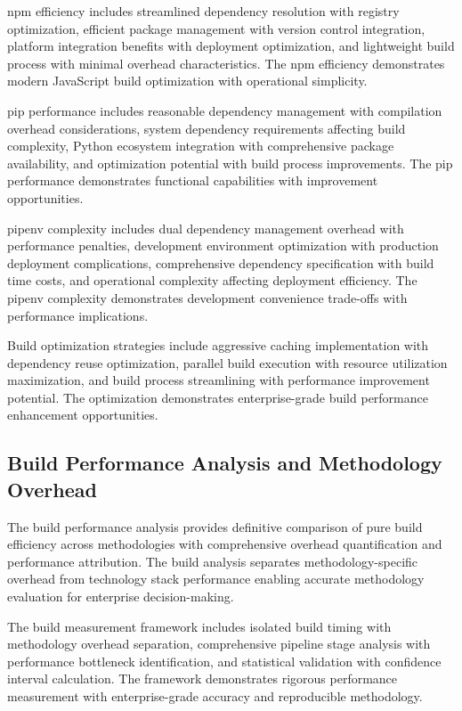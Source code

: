 npm efficiency includes streamlined dependency resolution with registry optimization, efficient package management with version control integration, platform integration benefits with deployment optimization, and lightweight build process with minimal overhead characteristics. The npm efficiency demonstrates modern JavaScript build optimization with operational simplicity.

pip performance includes reasonable dependency management with compilation overhead considerations, system dependency requirements affecting build complexity, Python ecosystem integration with comprehensive package availability, and optimization potential with build process improvements. The pip performance demonstrates functional capabilities with improvement opportunities.

pipenv complexity includes dual dependency management overhead with performance penalties, development environment optimization with production deployment complications, comprehensive dependency specification with build time costs, and operational complexity affecting deployment efficiency. The pipenv complexity demonstrates development convenience trade-offs with performance implications.

Build optimization strategies include aggressive caching implementation with dependency reuse optimization, parallel build execution with resource utilization maximization, and build process streamlining with performance improvement potential. The optimization demonstrates enterprise-grade build performance enhancement opportunities.


\subsection{Build Performance Analysis and Methodology Overhead}
\label{subsec:build_performance}

The build performance analysis provides definitive comparison of pure build efficiency across methodologies with comprehensive overhead quantification and performance attribution. The build analysis separates methodology-specific overhead from technology stack performance enabling accurate methodology evaluation for enterprise decision-making.

The build measurement framework includes isolated build timing with methodology overhead separation, comprehensive pipeline stage analysis with performance bottleneck identification, and statistical validation with confidence interval calculation. The framework demonstrates rigorous performance measurement with enterprise-grade accuracy and reproducible methodology.

